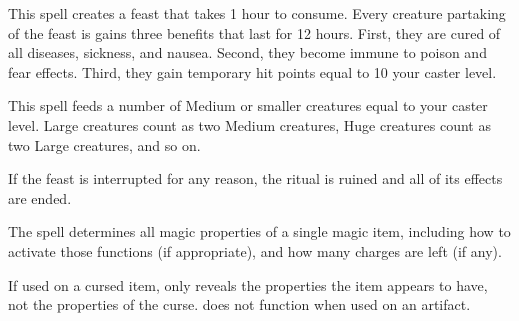 \spellrng{\rngclose}
\begin{spelleffect}
This spell creates a feast that takes 1 hour to consume. Every creature partaking of the feast is gains three benefits that last for 12 hours. First, they are cured of all diseases, sickness, and nausea. Second, they become immune to poison and fear effects. Third, they gain temporary hit points equal to 10 \add your caster level.

This spell feeds a number of Medium or smaller creatures equal to your caster level. Large creatures count as two Medium creatures, Huge creatures count as two Large creatures, and so on.
\end{spelleffect}
\begin{spellnotes}
If the feast is interrupted for any reason, the ritual is ruined and all of its effects are ended.
\end{spellnotes}

\begin{spelleffect}
The spell determines all magic properties of a single magic item, including how to activate those functions (if appropriate), and how many charges are left (if any).
\end{spelleffect}
\begin{spellnotes}
\par If used on a cursed item,  only reveals the properties the item appears to have, not the properties of the curse.  does not function when used on an artifact.
\end{spellnotes}

